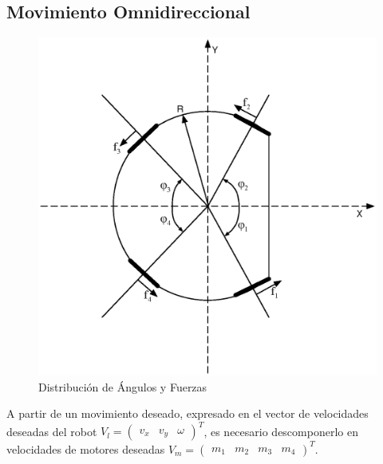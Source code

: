 \documentclass[twocolumn,10pt]{amrob}
\begin{document}
\subsection*{Movimiento Omnidireccional}
\begin{figure}
  \centering
    \includegraphics[scale=0.5]{anglesRobot.eps}
  \caption{Distribución de Ángulos y Fuerzas}
  \label{fig:angFzaDiag}
\end{figure}
A partir de un movimiento deseado, expresado en el vector de velocidades deseadas del robot \( V_l= \begin{pmatrix} v_x & v_y & \omega \end{pmatrix}^{T} \), es necesario descomponerlo en velocidades de motores deseadas \( V_m= \begin {pmatrix} m_1 & m_2 & m_3 & m_4 \end{pmatrix}^{T} \). 
\end{document}
